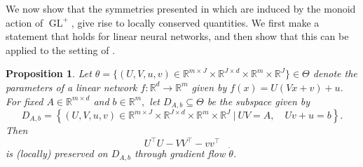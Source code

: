 \documentclass{article}
\newtheorem{prop}[theorem]{Proposition}
\theoremstyle{definition}
\newcommand{\R}{\mathbb{R}}
\DeclareMathOperator{\GL}{GL}
\begin{document}
We now show that the symmetries presented in 
which are induced by the monoid action of $\GL^+$, give rise to locally conserved quantities. 
We first make a statement that holds for linear neural networks, and then show that this can be applied to the setting of . 

\begin{prop}
\label{prop:conserved_q_linear}
    Let $\theta=\{(U,V,u,v) \in \R^{m \times J} \times \R^{J \times d} \times \R^m \times \R^J \}\in\Theta$ denote the parameters of a linear network $f:\R^d\rightarrow\R^m$ given by $f(x)=U(Vx+v)+u.$ 
    For fixed $A\in\R^{m\times d}$ and $ b\in\R^m,$ let $D_{A,b}\subseteq\Theta$ be the subspace given by 
    \begin{equation}\label{eq:cond_grad_flow}
D_{A,b}=\left\{(U,V,u,v) \in \R^{m \times J} \times \R^{J \times d} \times \R^m \times \R^J \ \vert \   UV = A, \quad Uv + u = b\right\}.
\end{equation}
Then  \begin{equation}
    U^\top U-VV^\top-vv^\top
\end{equation} is (locally) preserved on $D_{A,b}$ through gradient flow $\dot{\theta}$.
\end{prop}
\end{document}
